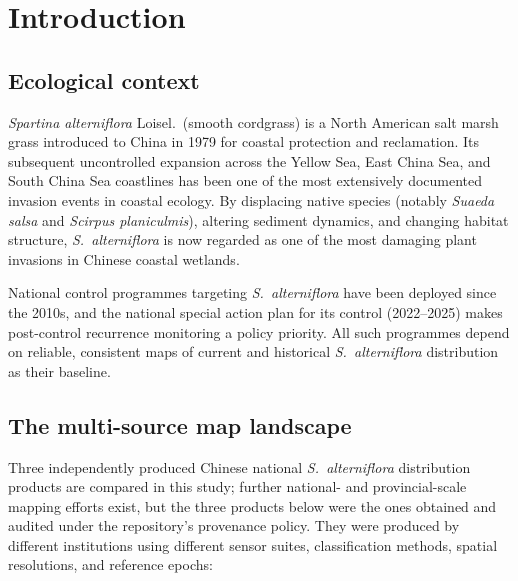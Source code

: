 \documentclass[11pt]{article}
\begin{document}
\section{Introduction}
\label{sec:introduction}

\subsection{Ecological context}

\textit{Spartina alterniflora} Loisel.\ (smooth cordgrass) is a North American
salt marsh grass introduced to China in 1979 for coastal protection and
reclamation\citep{li_2009_spartina, zhang_2023_jag}.
Its subsequent uncontrolled expansion across the Yellow Sea, East China Sea,
and South China Sea coastlines has been one of the most extensively documented
invasion events in coastal ecology\citep{li_2009_spartina}. By displacing native
species (notably \textit{Suaeda salsa} and \textit{Scirpus planiculmis}),
altering sediment dynamics, and changing habitat structure, \textit{S.~alterniflora}
is now regarded as one of the most damaging plant invasions in Chinese
coastal wetlands\citep{li_2009_spartina, zhang_2023_jag}.

National control programmes targeting \textit{S.~alterniflora} have been
deployed since the 2010s, and the national special action plan for its
control (2022--2025) makes post-control recurrence monitoring a policy
priority\citep{cma_2021_eradication}. All such programmes depend on
reliable, consistent maps of current and historical \textit{S.~alterniflora}
distribution as their baseline.

\subsection{The multi-source map landscape}

Three independently produced Chinese national \textit{S.~alterniflora} distribution
products are compared in this study; further national- and provincial-scale
mapping efforts exist\citep{zhang_2023_jag, li_2022_jem, zhao_2023_rse_saltmarsh},
but the three products below were the ones obtained and audited under the
repository's provenance policy. They were produced by different institutions
using different sensor suites, classification methods, spatial resolutions, and
reference epochs:
\end{document}

